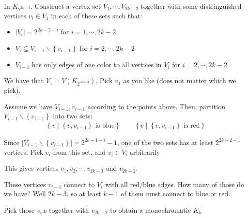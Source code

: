 \begin{prf}
  In $K_{2^{2k-3}}$. Construct a vertex set $V_1,\cdots, V_{2k-2}$ together with some distringuished vertices $v_i\in V_1$  in each of these sets such that:\par
  \begin{itemize}
    \item$\left|V_i\right| =2^{2k-2-i}$ for $i = 1,\cdots,2k-2$\par
    \item $V_i\subseteq V_{i-1}\backslash\left\{v_{i-1}\right\}$ for $i = 2,\cdots,2k-2$\par
    \item $V_{i-1}$ has only edges of one color to all vertices in $V_i$ for $i = 2,\cdots,2k-2$
  \end{itemize}
  \par\bigskip
  \noindent We have that $V_1 = V(K_{2^{2k-3}})$. Pick $v_1$ as you like (does not matter which we pick).
  \par\bigskip
  \noindent Assume we have $V_{i-1},v_{i-1}$ according to the points above. Then, partition $V_{i-1}\backslash\left\{v_{i-1}\right\}$ into two sets:
  \begin{equation*}
    \begin{gathered}
      \left\{v\;|\;\left\{v,v_{i-1}\right\}\text{ is blue}\right\}\qquad \left\{v\;|\;\left\{v,v_{i-1}\right\}\text{ is red}\right\}
    \end{gathered}
  \end{equation*}
  \par\bigskip
  \noindent Since $\left|V_{i-1}\backslash\left\{v_{i-1}\right\}\right| = 2^{2k-1-i}-1$, one of the two sets has at least $2^{2k-2-1}$ vertices. Pick $v_i$ from this set, and $v_i\in V_i$ arbitrarily
  \par\bigskip
  \noindent This gives vertices $v_1,v_2,\cdots,v_{2k-3}$ and $v_{2k-2}$.
  \par\bigskip
  \noindent These vertices $v_{i-1}$ connect to $V_i$ with all red/blue edges. How many of those do we have? Well $2k-3$, so at least $k-1$ of them must connect to blue or red.
  \par\bigskip
  \noindent Pick those $v_i$:s together with $v_{2k-2}$ to obtain a monochromatic $K_k$
\end{prf}
